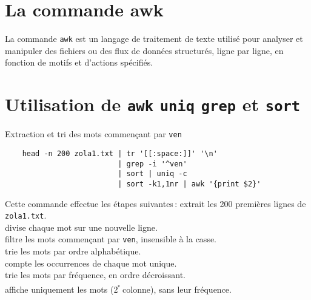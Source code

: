 \documentclass[a4paper]{report}
\begin{document}
    \section{La commande awk}
    \begin{Définition}
        La commande \texttt{awk} est un langage de traitement de texte utilisé pour
        analyser et manipuler des fichiers ou des flux de données structurés, ligne
        par ligne, en fonction de motifs et d'actions spécifiés.
    \end{Définition}



    \section{Utilisation de \texttt{awk} \texttt{uniq} \texttt{grep}   et \texttt{sort}}

    \begin{EExample}{Extraction et tri des mots commençant par \texttt{ven}}{}
        \begin{verbatim}
    head -n 200 zola1.txt | tr '[[:space:]]' '\n' 
                          | grep -i '^ven' 
                          | sort | uniq -c 
                          | sort -k1,1nr | awk '{print $2}'
        \end{verbatim}
        Cette commande effectue les étapes suivantes :
        extrait les 200 premières lignes de \texttt{zola1.txt}. \\
        divise chaque mot sur une nouvelle ligne. \\
        filtre les mots commençant par \texttt{ven}, insensible à la casse. \\
        trie les mots par ordre alphabétique. \\
        compte les occurrences de chaque mot unique. \\
        \noindent  {} 
        trie les mots par fréquence, en ordre décroissant. \\
        \noindent {} 
        affiche uniquement les mots (2\textsuperscript{ᵉ} colonne), sans leur fréquence.
    \end{EExample}
\end{document}
